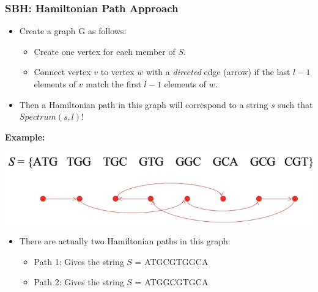 \documentclass[10pt]{article}
\begin{document}
\subsubsection*{SBH: Hamiltonian Path Approach}
\begin{itemize}
    \item Create a graph G as follows:
    \begin{itemize}
        \item Create one vertex for each member of $S$.
        \item Connect vertex $v$ to vertex $w$ with a \textit{directed} edge (arrow) if the last $l - 1$ elements of $v$ match the first $l - 1$ elements of $w$.
    \end{itemize}
    \item Then a Hamiltonian path in this graph will correspond to a string $s$ such that $Spectrum(s, l)$!
\end{itemize}
\textbf{Example:}
\begin{center}
    \includegraphics*[width=\textwidth]{W4_11.png}
\end{center}
\begin{itemize}
    \item There are actually two Hamiltonian paths in this graph:
    \begin{itemize}
        \item Path 1: Gives the string $S$ = ATGCGTGGCA
        \item Path 2: Gives the string $S$ = ATGGCGTGCA
    \end{itemize}
\end{itemize}
\end{document}
